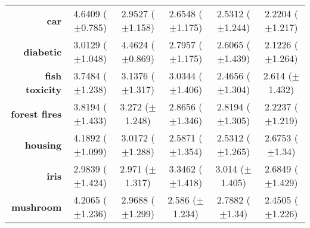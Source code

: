 \begin{table}[htb]
{\begin{tabular}{r|ccccc}
                  \textbf{car}                 & \cellcolor[rgb]{ .973,  .412,  .42}4.6409 ($\pm$0.785)  & \cellcolor[rgb]{ .996,  .847,  .506}2.9527 ($\pm$1.158) & \cellcolor[rgb]{ 1,  .922,  .518}2.6548 ($\pm$1.175)    & \cellcolor[rgb]{ .824,  .871,  .506}2.5312 ($\pm$1.244) & \cellcolor[rgb]{ .388,  .745,  .482}2.2204 ($\pm$1.217) \\
                  \textbf{diabetic}            & \cellcolor[rgb]{ 1,  .859,  .506}3.0129 ($\pm$1.048)    & \cellcolor[rgb]{ .973,  .412,  .42}4.4624 ($\pm$0.869)  & \cellcolor[rgb]{ 1,  .922,  .518}2.7957 ($\pm$1.175)    & \cellcolor[rgb]{ .827,  .871,  .506}2.6065 ($\pm$1.439) & \cellcolor[rgb]{ .388,  .745,  .482}2.1226 ($\pm$1.264) \\
                  \textbf{fish toxicity}       & \cellcolor[rgb]{ .973,  .412,  .42}3.7484 ($\pm$1.238)  & \cellcolor[rgb]{ .996,  .851,  .506}3.1376 ($\pm$1.317) & \cellcolor[rgb]{ 1,  .922,  .518}3.0344 ($\pm$1.406)    & \cellcolor[rgb]{ .388,  .745,  .482}2.4656 ($\pm$1.304) & \cellcolor[rgb]{ .545,  .788,  .49}2.614 ($\pm$1.432)   \\
                  \textbf{forest fires}        & \cellcolor[rgb]{ .973,  .412,  .42}3.8194 ($\pm$1.433)  & \cellcolor[rgb]{ .992,  .706,  .478}3.272 ($\pm$1.248)  & \cellcolor[rgb]{ 1,  .922,  .518}2.8656 ($\pm$1.346)    & \cellcolor[rgb]{ .953,  .906,  .514}2.8194 ($\pm$1.305) & \cellcolor[rgb]{ .388,  .745,  .482}2.2237 ($\pm$1.219) \\
                  \textbf{housing}             & \cellcolor[rgb]{ .973,  .412,  .42}4.1892 ($\pm$1.099)  & \cellcolor[rgb]{ .996,  .808,  .498}3.0172 ($\pm$1.288) & \cellcolor[rgb]{ .624,  .812,  .494}2.5871 ($\pm$1.354) & \cellcolor[rgb]{ .388,  .745,  .482}2.5312 ($\pm$1.265) & \cellcolor[rgb]{ 1,  .922,  .518}2.6753 ($\pm$1.34)     \\
                  \textbf{iris}                & \cellcolor[rgb]{ 1,  .922,  .518}2.9839 ($\pm$1.424)    & \cellcolor[rgb]{ .973,  .914,  .514}2.971 ($\pm$1.317)  & \cellcolor[rgb]{ .973,  .412,  .42}3.3462 ($\pm$1.418)  & \cellcolor[rgb]{ 1,  .882,  .51}3.014 ($\pm$1.405)      & \cellcolor[rgb]{ .388,  .745,  .482}2.6849 ($\pm$1.429) \\
                  \textbf{mushroom}            & \cellcolor[rgb]{ .973,  .412,  .42}4.2065 ($\pm$1.236)  & \cellcolor[rgb]{ 1,  .859,  .506}2.9688 ($\pm$1.299)    & \cellcolor[rgb]{ .631,  .816,  .494}2.586 ($\pm$1.234)  & \cellcolor[rgb]{ 1,  .922,  .518}2.7882 ($\pm$1.34)     & \cellcolor[rgb]{ .388,  .745,  .482}2.4505 ($\pm$1.226) \\

\end{tabular}}
\end{table}
